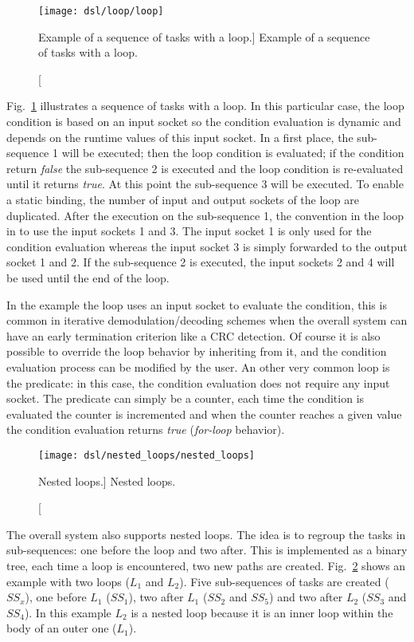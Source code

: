 \begin{figure}[htp]
  \centering
  \texttt{[image: dsl/loop/loop]}
  \caption
    [Example of a sequence of tasks with a loop.]
    {Example of a sequence of tasks with a loop.}
  \label{fig:dsl_loop}
\end{figure}

Fig.~\ref{fig:dsl_loop} illustrates a sequence of tasks with a loop. In this
particular case, the loop condition is based on an input socket so the condition
evaluation is dynamic and depends on the runtime values of this input socket.
In a first place, the sub-sequence 1 will be executed; then the loop condition
is evaluated; if the condition return \emph{false} the sub-sequence 2 is
executed and the loop condition is re-evaluated until it returns \emph{true}. At
this point the sub-sequence 3 will be executed. To enable a static binding, the
number of input and output sockets of the loop are duplicated. After the
execution on the sub-sequence 1, the convention in the loop in to use the input
sockets 1 and 3. The input socket 1 is only used for the condition evaluation
whereas the input socket 3 is simply forwarded to the output socket 1 and 2. If
the sub-sequence 2 is executed, the input sockets 2 and 4 will be used until the
end of the loop.

In the example the loop uses an input socket to evaluate the condition, this is
common in iterative demodulation/decoding schemes when the overall system can
have an early termination criterion like a CRC detection. Of course it is also
possible to override the loop behavior by inheriting from it, and the condition
evaluation process can be modified by the user. An other very common loop is the
predicate: in this case, the condition evaluation does not require any input
socket. The predicate can simply be a counter, each time the condition is
evaluated the counter is incremented and when the counter reaches a given value
the condition evaluation returns \emph{true} (\emph{for-loop} behavior).

\begin{figure}[htp]
  \centering
  \texttt{[image: dsl/nested\_loops/nested\_loops]}
  \caption
    [Nested loops.]
    {Nested loops.}
  \label{fig:dsl_nested_loops}
\end{figure}

The overall system also supports nested loops. The idea is to regroup the tasks
in sub-sequences: one before the loop and two after. This is implemented as a
binary tree, each time a loop is encountered, two new paths are created.
Fig.~\ref{fig:dsl_nested_loops} shows an example with two loops ($L_1$ and
$L_2$). Five sub-sequences of tasks are created ($SS_x$), one before $L_1$
($SS_1$), two after $L_1$ ($SS_2$ and $SS_5$) and two after $L_2$ ($SS_3$ and
$SS_4$). In this example $L_2$ is a nested loop because it is an inner loop
within the body of an outer one ($L_1$).

